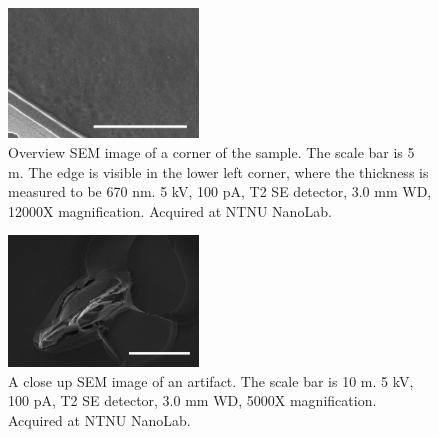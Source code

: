 \begin{figure}[ht]
    \centering
    \includegraphics[width=0.45\textwidth]{figures/sem_high_res_5um.jpg}
    \caption{Overview SEM image of a corner of the sample.
        The scale bar is 5 \textmu m.
        The edge is visible in the lower left corner, where the thickness is measured to be 670 nm.
        5 kV, 100 pA, T2 SE detector, 3.0 mm WD, 12000X magnification.
        Acquired at NTNU NanoLab.
    }
    \label{fig:sem_high_res}
\end{figure}

\begin{figure}[ht]
    \centering
    \includegraphics[width=0.45\textwidth]{figures/sem_artifact_10um.jpg}
    \caption{A close up SEM image of an artifact.
        The scale bar is 10 \textmu m.
        5 kV, 100 pA, T2 SE detector, 3.0 mm WD, 5000X magnification.
        Acquired at NTNU NanoLab.
    }
    \label{fig:sem_artifact}
\end{figure}
